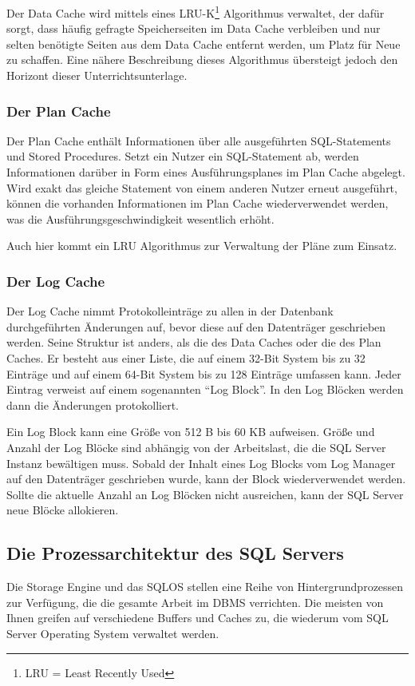           Der Data Cache wird mittels eines LRU-K\footnote{LRU = Least Recently
          Used} Algorithmus verwaltet, der dafür sorgt, dass häufig gefragte
          Speicherseiten im Data Cache verbleiben und nur selten benötigte
          Seiten aus dem Data Cache entfernt werden, um Platz für Neue zu
          schaffen. Eine nähere Beschreibung dieses Algorithmus übersteigt
          jedoch den Horizont dieser Unterrichtsunterlage.
\clearpage
        \subsubsection{Der Plan Cache}
          Der Plan Cache enth\"alt Informationen \"uber alle ausgef\"uhrten
          SQL-Statements und Stored Procedures. Setzt ein Nutzer ein
          SQL-Statement ab, werden Informationen dar\"uber in Form eines
          Ausf\"uhrungsplanes im Plan Cache abgelegt. Wird exakt das gleiche
          Statement von einem anderen Nutzer erneut ausgef\"uhrt, k\"onnen die
          vorhanden Informationen im Plan Cache wiederverwendet werden, was
          die Ausf\"uhrungsgeschwindigkeit wesentlich erh\"oht.

          Auch hier kommt ein LRU Algorithmus zur Verwaltung der Pläne zum
          Einsatz.
        \subsubsection{Der Log Cache}
          Der Log Cache nimmt Protokolleinträge zu allen in der Datenbank
          durchgeführten Änderungen auf, bevor diese auf den Datenträger
          geschrieben werden. Seine Struktur ist anders, als die des Data Caches
          oder die des Plan Caches. Er besteht aus einer Liste, die auf einem
          32-Bit System bis zu 32 Einträge und auf einem 64-Bit System bis zu
          128 Einträge umfassen kann. Jeder Eintrag verweist auf einem
          sogenannten \enquote{Log Block}. In den Log Blöcken werden dann die
          Änderungen protokolliert.
          
          Ein Log Block kann eine Größe von 512 B bis 60 KB aufweisen. Größe und
          Anzahl der Log Blöcke sind abhängig von der Arbeitslast, die die SQL
          Server Instanz bewältigen muss. Sobald der Inhalt eines Log Blocks vom
          Log Manager auf den Datenträger geschrieben wurde, kann der Block
          wiederverwendet werden. Sollte die aktuelle Anzahl an Log Blöcken
          nicht ausreichen, kann der SQL Server neue Blöcke allokieren.
      \subsection{Die Prozessarchitektur des SQL Servers}
        Die Storage Engine und das SQLOS stellen eine Reihe von
        Hintergrundprozessen zur Verfügung, die die gesamte Arbeit im DBMS
        verrichten. Die meisten von Ihnen greifen auf verschiedene Buffers und
        Caches zu, die wiederum vom SQL Server Operating System verwaltet
        werden.
